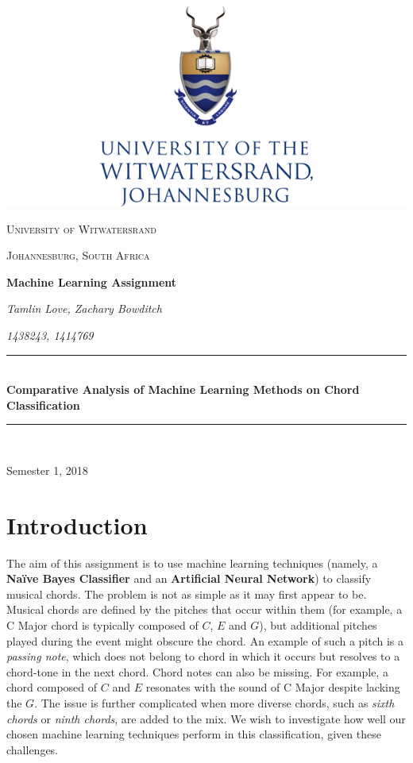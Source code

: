 \documentclass[a4paper]{article}
\begin{document}
\begin{titlepage}
	\centering
	
\includegraphics[scale=0.5]{index.png}
	\vspace{1cm}
	
\newcommand{\HRule}{\rule{\linewidth}{0.5mm}} 

{\scshape\Large University of Witwatersrand\par}
{\scshape\Large Johannesburg, South Africa\par}
	\vspace{1.5cm}
	{\huge\bfseries Machine Learning Assignment \par}
	\vspace{2cm}
	{\Large\itshape Tamlin Love, Zachary Bowditch\par}
	\vspace{0.5cm}
	{\Large\itshape 1438243, 1414769\par}
	\vfill
	
\HRule \\[0.4cm]
{ \huge \bfseries Comparative Analysis of Machine Learning Methods on Chord Classification}\\[0.4cm] 
\HRule \\[1.5cm]

	{\large Semester 1, 2018\par}

\end{titlepage}
\section{Introduction}
The aim of this assignment is to use machine learning techniques (namely, a \textbf{Naïve Bayes Classifier} and an \textbf{Artificial Neural Network}) to classify musical chords. The problem is not as simple as it may first appear to be. Musical chords are defined by the pitches that occur within them (for example, a C Major chord is typically composed of $C$, $E$ and $G$), but additional pitches played during the event might obscure the chord. An example of such a pitch is a \textit{passing note}, which does not belong to chord in which it occurs but resolves to a chord-tone in the next chord. Chord notes can also be missing. For example, a chord composed of $C$ and $E$ resonates with the sound of C Major despite lacking the $G$. The issue is further complicated when more diverse chords, such as \textit{sixth chords} or \textit{ninth chords}, are added to the mix. We wish to investigate how well our chosen machine learning techniques perform in this classification, given these challenges.
\end{document}
